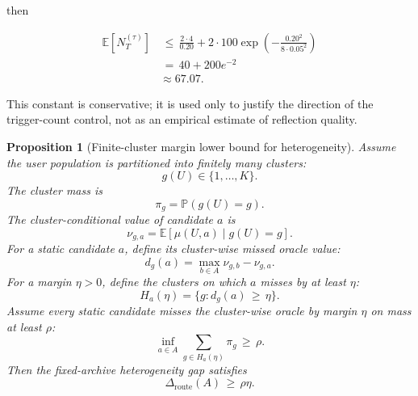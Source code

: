 \documentclass{article} %
\newtheorem{proposition}[theorem]{Proposition}
\begin{document}
then

\begin{align}
\label{eq:app-fifth-trigger-example}
\mathbb{E}[N_T^{(\tau)}]
&\,\le\,
\frac{2\cdot 4}{0.20}
+
2\cdot 100\exp\!\left(
-\frac{0.20^2}{8\cdot 0.05^2}
\right)
\\
&\,=\,
40+200e^{-2}
\\
&\approx
67.07.
\end{align}

This constant is conservative; it is used only to justify the direction of the trigger-count control, not as an empirical estimate of reflection quality.

\begin{proposition}[Finite-cluster margin lower bound for heterogeneity]
\label{prop:13}
Assume the user population is partitioned into finitely many clusters:
\begin{equation}
\label{eq:app-fifth-cluster-set}
g(U)\in\{1,\ldots,K\}.
\end{equation}
The cluster mass is
\begin{equation}
\label{eq:app-fifth-cluster-mass}
\pi_g
=
\mathbb{P}(g(U)=g).
\end{equation}
The cluster-conditional value of candidate \(a\) is
\begin{equation}
\label{eq:app-fifth-cluster-value}
\nu_{g,a}
=
\mathbb{E}[\mu(U,a)\mid g(U)=g].
\end{equation}
For a static candidate \(a\), define its cluster-wise missed oracle value:
\begin{equation}
\label{eq:app-fifth-missed-value}
d_g(a)
=
\max_{b\in A}\nu_{g,b}
-
\nu_{g,a}.
\end{equation}
For a margin \(\eta>0\), define the clusters on which \(a\) misses by at least \(\eta\):
\begin{equation}
\label{eq:app-fifth-margin-set}
H_a(\eta)
=
\{g:d_g(a)\,\ge\, \eta\}.
\end{equation}
Assume every static candidate misses the cluster-wise oracle by margin \(\eta\) on mass at least \(\rho\):
\begin{equation}
\label{eq:app-fifth-margin-condition}
\inf_{a\in A}
\sum_{g\in H_a(\eta)}\pi_g
\,\ge\,
\rho.
\end{equation}
Then the fixed-archive heterogeneity gap satisfies
\begin{equation}
\label{eq:app-fifth-margin-gap}
\Delta_{\mathrm{route}}(A)
\,\ge\,
\rho\eta.
\end{equation}
\end{proposition}
\end{document}
